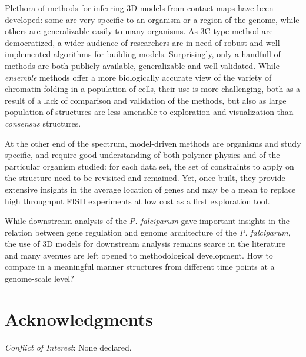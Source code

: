 \documentclass[2columns]{article}
\begin{document}
Plethora of methods for inferring 3D models from contact maps have been
developed: some are very specific to an organism or a region of the genome,
while others are generalizable easily to many organisms. As 3C-type method are
democratized, a wider audience of researchers are in need of robust and
well-implemented algorithms for building models. Surprisingly, only a handfull
of methods are both publicly available, generalizable and well-validated.
While \textit{ensemble} methods offer a more biologically accurate view of the
variety of chromatin folding in a population of cells, their use is more
challenging, both as a result of a lack of comparison and validation of the
methods, but also as large population of structures are less amenable to
exploration and visualization than \textit{consensus} structures.

At the other end of the spectrum, model-driven methods are organisms and study
specific, and require good understanding of both polymer physics and of the
particular organism studied: for each data set, the set of constraints to
apply on the structure need to be revisited and remained. Yet, once built,
they provide extensive insights in the average location of genes and may be a
mean to replace high throughput FISH experiments at low cost as a first
exploration tool.

While downstream analysis of the {\em P. falciparum} gave important insights
in the relation between gene regulation and genome architecture of the {\em P.
falciparum}, the use of 3D models for downstream analysis remains scarce in
the literature and many avenues are left opened to methodological development.
How to compare in a meaningful manner structures from different time points at
a genome-scale level? 

\section*{Acknowledgments}



{\it Conflict of Interest}: None declared.




\end{document}
